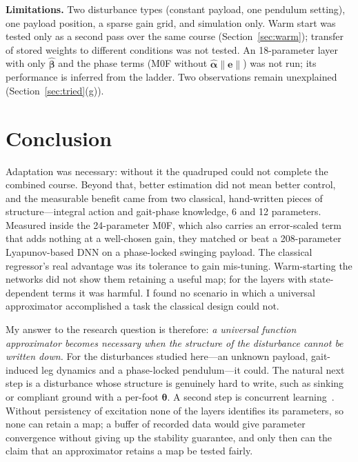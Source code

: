\documentclass[conference]{IEEEtran}
\begin{document}
\textbf{Limitations.} Two disturbance types (constant payload, one
pendulum setting), one payload position, a sparse gain grid, and
simulation only. Warm start was tested only as a second pass over the
same course (Section~\ref{sec:warm}); transfer of stored weights to
different conditions was not tested. An 18-parameter layer with only
$\hat{\bm\beta}$ and the phase terms (M0F without
$\hat{\bm\alpha}\|\bm e\|$) was not run; its performance is inferred from
the ladder. Two observations remain unexplained
(Section~\ref{sec:tried}(g)).

\section{Conclusion}

Adaptation was necessary: without it the quadruped could not complete
the combined course. Beyond that, better estimation did not mean better
control, and the measurable benefit came from two classical, hand-written
pieces of structure---integral action and gait-phase knowledge, 6 and
12 parameters. Measured inside the 24-parameter M0F, which also carries
an error-scaled term that adds nothing at a well-chosen gain, they
matched or beat a 208-parameter Lyapunov-based DNN on a phase-locked
swinging payload. The classical regressor's
real advantage was its tolerance to gain mis-tuning. Warm-starting the
networks did not show them retaining a useful map; for the layers with
state-dependent terms it was harmful. I found no scenario
in which a universal approximator accomplished a task the classical
design could not.

My answer to the research question is therefore: \emph{a universal
function approximator becomes necessary when the structure of the
disturbance cannot be written down.} For the disturbances studied
here---an unknown payload, gait-induced leg dynamics and a phase-locked
pendulum---it could. The natural next step is a disturbance whose
structure is genuinely hard to write, such as sinking or compliant
ground with a per-foot $\bm\theta$. A second step is concurrent
learning~\cite{chowdhary2010}. Without persistency of excitation none of
the layers identifies its parameters, so none can retain a map; a buffer
of recorded data would give parameter convergence without giving up the
stability guarantee, and only then can the claim that an approximator
retains a map be tested fairly.

\end{document}
